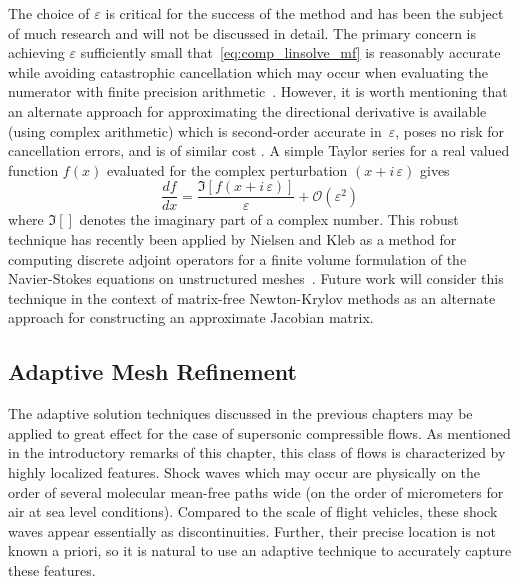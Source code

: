 The choice of $\varepsilon$ is critical for the success of the method and has been the subject of much research and will not be discussed in detail.  The primary concern is achieving $\varepsilon$ sufficiently small that~\eqref{eq:comp_linsolve_mf} is reasonably accurate while avoiding catastrophic cancellation which may occur when evaluating the numerator with finite precision arithmetic~\cite{johan_hughes_shakib_mf}.  However, it is worth mentioning that an alternate approach for approximating the directional derivative is available (using complex arithmetic) which is second-order accurate in~$\varepsilon$, poses no risk for cancellation errors, and is of similar cost .  A simple Taylor series for a real valued function $f\left(x\right)$ evaluated for the complex perturbation $\left(x+i\,\varepsilon\right)$ gives
\begin{equation*}
  \frac{df}{dx} = \frac{\Im\left[f\left(x+i\,\varepsilon\right)\right]}{\varepsilon} + \mathcal{O}\left(\varepsilon^2\right)
\end{equation*}
where $\Im[]$ denotes the imaginary part of a complex number.  This robust technique has recently been applied by Nielsen and Kleb as a method for computing discrete adjoint operators for a finite volume formulation of the Navier-Stokes equations on unstructured meshes~\cite{nielsen_kleb_2005}.  Future work will consider this technique in the context of matrix-free Newton-Krylov methods as an alternate approach for constructing an approximate Jacobian matrix.

\subsection{Adaptive Mesh Refinement\label{sec:comp_ns_amr}}

The adaptive solution techniques discussed in the previous chapters may be applied to great effect for the case of supersonic compressible flows.  As mentioned in the introductory remarks of this chapter, this class of flows is characterized by highly localized features.  Shock waves which may occur are physically on the order of several molecular mean-free paths wide (on the order of micrometers for air at sea level conditions).  Compared to the scale of flight vehicles, these shock waves appear essentially as discontinuities.  Further, their precise location is not known a priori, so it is natural to use an adaptive technique to accurately capture these features.

